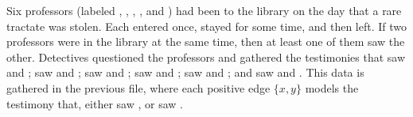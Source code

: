 \documentclass[a4paper,12pt,english]{sphinxhowto}
\begin{document}
\begin{sphinxVerbatim}[commandchars=\\\{\},numbers=left,firstnumber=1,stepnumber=1]
\PYG{p}{[}\PYG{p}{]}  
\PYG{p}{[}\PYG{p}{]}  
\PYG{p}{[}\PYG{p}{]}  
\PYG{p}{[}\PYG{p}{]}  
\PYG{p}{[}\PYG{p}{]}  
\end{sphinxVerbatim}

Six professors (labeled , , , ,  and ) had been to the library on the day that a rare tractate was stolen. Each entered once, stayed for some time, and then left. If two professors were in the library at the same time, then at least one of them saw the other. Detectives questioned the professors and gathered the testimonies that  saw  and ;  saw  and ;  saw  and ;  saw  and ;  saw  and ; and  saw  and . This data is gathered in the previous file, where each positive edge \(\{x,y\}\) models the testimony that, either  saw , or  saw .
\end{document}
